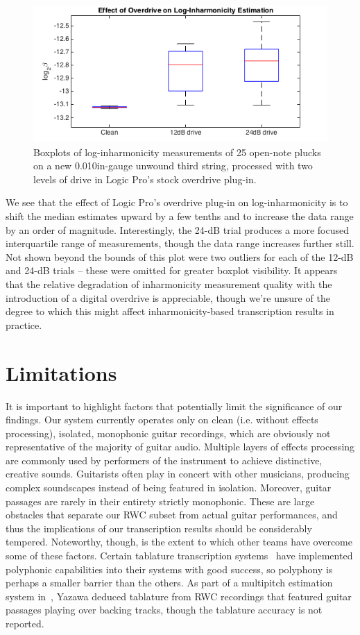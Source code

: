 \documentclass[12pt]{cmuthesis}
\begin{document}
\begin{figure}[!htbp] 
\centering
\includegraphics[scale=0.6]{eg-params-od}
\caption{Boxplots of log-inharmonicity measurements of 25 open-note plucks on a new 0.010in-gauge unwound third string, processed with two levels of drive in Logic Pro's stock overdrive plug-in.}
\label{fig:eg-params-od}
\end{figure} 

We see that the effect of Logic Pro's overdrive plug-in on log-inharmonicity is to shift the median estimates upward by a few tenths and to increase the data range by an order of magnitude. Interestingly, the 24-dB trial produces a more focused interquartile range of measurements, though the data range increases further still. Not shown beyond the bounds of this plot were two outliers for each of the 12-dB and 24-dB trials -- these were omitted for greater boxplot visibility. It appears that the relative degradation of inharmonicity measurement quality with the introduction of a digital overdrive is appreciable, though we're unsure of the degree to which this might affect inharmonicity-based transcription results in practice.

\section{Limitations}
It is important to highlight factors that potentially limit the significance of our findings. Our system currently operates only on clean (i.e. without effects processing), isolated, monophonic guitar recordings, which are obviously not representative of the majority of guitar audio. Multiple layers of effects processing are commonly used by performers of the instrument to achieve distinctive, creative sounds. Guitarists often play in concert with other musicians, producing complex soundscapes instead of being featured in isolation. Moreover, guitar passages are rarely in their entirety strictly monophonic. These are large obstacles that separate our RWC subset from actual guitar performances, and thus the implications of our transcription results should be considerably tempered. Noteworthy, though, is the extent to which other teams have overcome some of these factors. Certain tablature transcription systems~\cite{barbanchoi2012,abesser2012,dittmar2013,kehling2014} have implemented polyphonic capabilities into their systems with good success, so polyphony is perhaps a smaller barrier than the others. As part of a multipitch estimation system in~\cite{yazawa2013}, Yazawa deduced tablature from RWC recordings that featured guitar passages playing over backing tracks, though the tablature accuracy is not reported.
\end{document}
